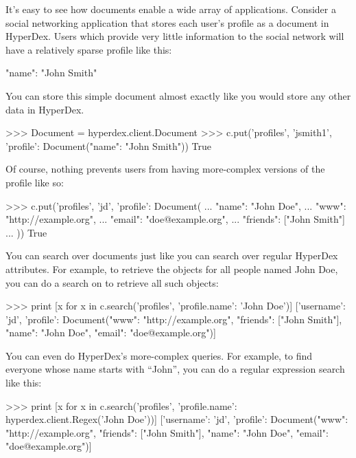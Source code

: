 It's easy to see how documents enable a wide array of applications.  Consider a
social networking application that stores each user's profile as a document in
HyperDex.  Users which provide very little information to the social network
will have a relatively sparse profile like this:

\begin{jsoncode}
{"name": "John Smith"}
\end{jsoncode}

You can store this simple document almost exactly like you would store any other
data in HyperDex.

\begin{pythoncode}
>>> Document = hyperdex.client.Document
>>> c.put('profiles', 'jsmith1', {'profile': Document({"name": "John Smith"})})
True
\end{pythoncode}

Of course, nothing prevents users from having more-complex versions of the
profile like so:

\begin{pythoncode}
>>> c.put('profiles', 'jd', {'profile': Document({
...     "name": "John Doe",
...     "www": "http://example.org",
...     "email": "doe@example.org",
...     "friends": ["John Smith"]
... })})
True
\end{pythoncode}

You can search over documents just like you can search over regular HyperDex
attributes.  For example, to retrieve the objects for all people named John Doe,
you can do a search on  to retrieve all such objects:

\begin{pythoncode}
>>> print [x for x in c.search('profiles', {'profile.name': 'John Doe'})]
[{'username': 'jd', 'profile': Document({"www": "http://example.org", "friends":
["John Smith"], "name": "John Doe", "email": "doe@example.org"})}]
\end{pythoncode}

You can even do HyperDex's more-complex queries.  For example, to find everyone
whose name starts with ``John'', you can do a regular expression search like
this:

\begin{pythoncode}
>>> print [x for x in c.search('profiles', {'profile.name': hyperdex.client.Regex('John Doe')})]
[{'username': 'jd', 'profile': Document({"www": "http://example.org", "friends":
["John Smith"], "name": "John Doe", "email": "doe@example.org"})}]
\end{pythoncode}

